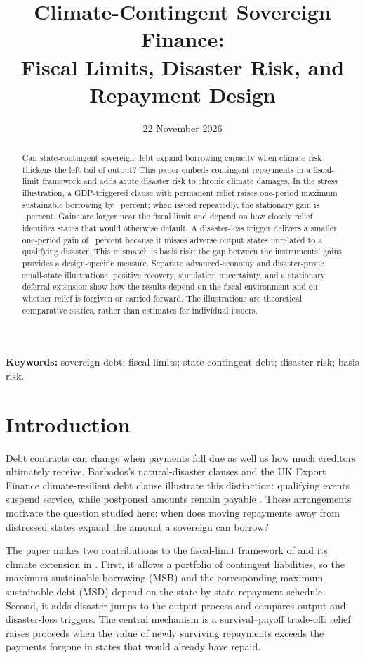 \documentclass[11pt]{article}
\title{\bf Climate-Contingent Sovereign Finance:\\Fiscal Limits, Disaster Risk, and Repayment Design}
\author{}
\date{22 November 2026}
\begin{document}
\maketitle
\begin{abstract}
Can state-contingent sovereign debt expand borrowing capacity when climate risk thickens the left tail of output? This paper embeds contingent repayments in a fiscal-limit framework and adds acute disaster risk to chronic climate damages. In the stress illustration, a GDP-triggered clause with permanent relief raises one-period maximum sustainable borrowing by \StressGDPOneGain\ percent; when issued repeatedly, the stationary gain is \StressGDPStationaryGain\ percent. Gains are larger near the fiscal limit and depend on how closely relief identifies states that would otherwise default. A disaster-loss trigger delivers a smaller one-period gain of \StressDisasterOneGain\ percent because it misses adverse output states unrelated to a qualifying disaster. This mismatch is basis risk; the gap between the instruments' gains provides a design-specific measure. Separate advanced-economy and disaster-prone small-state illustrations, positive recovery, simulation uncertainty, and a stationary deferral extension show how the results depend on the fiscal environment and on whether relief is forgiven or carried forward. The illustrations are theoretical comparative statics, rather than estimates for individual issuers.
\end{abstract}
\noindent\textbf{Keywords:} sovereign debt; fiscal limits; state-contingent debt; disaster risk; basis risk.

\section{Introduction}\label{sec:intro}
Debt contracts can change when payments fall due as well as how much creditors ultimately receive. Barbados's natural-disaster clauses and the UK Export Finance climate-resilient debt clause illustrate this distinction: qualifying events suspend service, while postponed amounts remain payable \parencite{imf_barbados2022_crdc,icma2022_crdc_chairs_summary,ukgov2023_crdc}. These arrangements motivate the question studied here: when does moving repayments away from distressed states expand the amount a sovereign can borrow?

The paper makes two contributions to the fiscal-limit framework of \textcite{CollardEtAl2015} and its climate extension in \textcite{Seghini2026}. First, it allows a portfolio of contingent liabilities, so the maximum sustainable borrowing (MSB) and the corresponding maximum sustainable debt (MSD) depend on the state-by-state repayment schedule. Second, it adds disaster jumps to the output process and compares output and disaster-loss triggers. The central mechanism is a survival--payoff trade-off: relief raises proceeds when the value of newly surviving repayments exceeds the payments forgone in states that would already have repaid.
\end{document}
